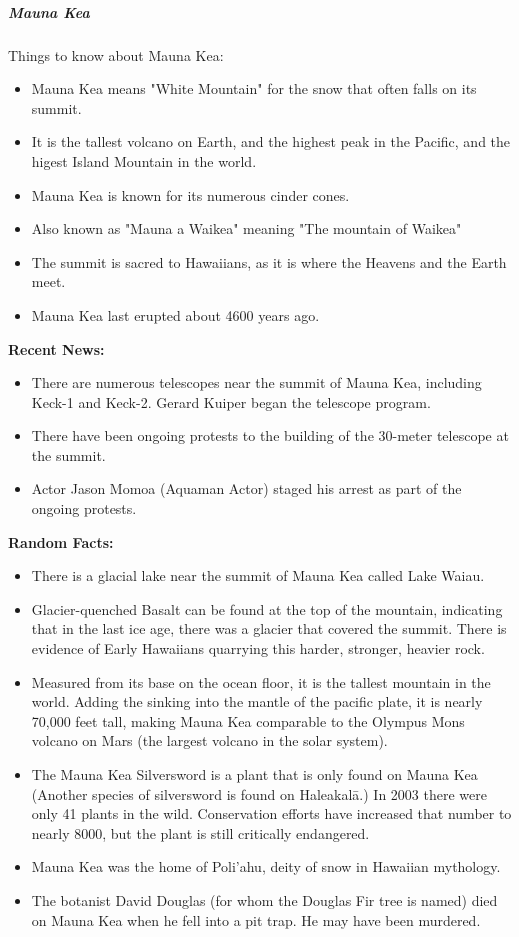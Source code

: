 					\newpage
					\subparagraph{Mauna Kea}
						Things to know about Mauna Kea:
						\begin{itemize}
							\item Mauna Kea means "White Mountain" for the snow that often falls on its summit.
							\item It is the tallest volcano on Earth, and the highest peak in the Pacific, and the higest Island Mountain in the world.
							\item Mauna Kea is known for its numerous cinder cones.
							\item Also known as "Mauna a Waikea" meaning "The mountain of Waikea"
							\item The summit is sacred to Hawaiians, as it is where the Heavens and the Earth meet.
							\item Mauna Kea last erupted about 4600 years ago. 
	
							
						\end{itemize}
					\textbf{Recent News:}
							\begin{itemize}
								\item There are numerous telescopes near the summit of Mauna Kea, including Keck-1 and Keck-2.  Gerard Kuiper began the telescope program.  
								\item There have been ongoing protests to the building of the 30-meter telescope at the summit. 
								\item Actor Jason Momoa (Aquaman Actor) staged his arrest as part of the ongoing protests.
							\end{itemize}
					\textbf{Random Facts:}
							\begin{itemize}
								\item There is a glacial lake near the summit of Mauna Kea called Lake Waiau.
								\item Glacier-quenched Basalt can be found at the top of the mountain, indicating that in the last ice age, there was a glacier that covered the summit.  There is evidence of Early Hawaiians quarrying this harder, stronger, heavier rock. 
								\item Measured from its base on the ocean floor, it is the tallest mountain in the world.  Adding the sinking into the mantle of the pacific plate, it is nearly 70,000 feet tall, making Mauna Kea comparable to the Olympus Mons volcano on Mars (the largest volcano in the solar system).  
								\item The Mauna Kea Silversword is a plant that is only found on Mauna Kea (Another species of silversword is found on Haleakal\=a.)  In 2003 there were only 41 plants in the wild.  Conservation efforts have increased that number to nearly 8000, but the plant is still critically endangered. 
								\item Mauna Kea was the home of  Poli'ahu, deity of snow in Hawaiian mythology.
								\item The botanist David Douglas (for whom the Douglas Fir tree is named) died on Mauna Kea when he fell into a pit trap.  He may have been murdered.
								
								
							\end{itemize}


